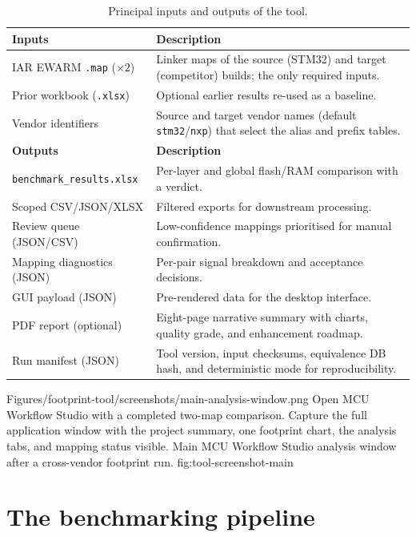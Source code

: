 \begin{table}[H]
\centering
\caption{Principal inputs and outputs of the tool.}
\label{tab:tool-io}
\begin{tabularx}{\textwidth}{l X}
\toprule
\textbf{Inputs} & \textbf{Description} \\
\midrule
IAR EWARM \texttt{.map} ($\times 2$) & Linker maps of the source (STM32) and target (competitor) builds; the only required inputs. \\
Prior workbook (\texttt{.xlsx}) & Optional earlier results re-used as a baseline. \\
Vendor identifiers & Source and target vendor names (default \texttt{stm32}/\texttt{nxp}) that select the alias and prefix tables. \\
\midrule
\textbf{Outputs} & \textbf{Description} \\
\midrule
\texttt{benchmark\_results.xlsx} & Per-layer and global flash/RAM comparison with a verdict. \\
Scoped CSV/JSON/XLSX & Filtered exports for downstream processing. \\
Review queue (JSON/CSV) & Low-confidence mappings prioritised for manual confirmation. \\
Mapping diagnostics (JSON) & Per-pair signal breakdown and acceptance decisions. \\
GUI payload (JSON) & Pre-rendered data for the desktop interface. \\
PDF report (optional) & Eight-page narrative summary with charts, quality grade, and enhancement roadmap. \\
Run manifest (JSON) & Tool version, input checksums, equivalence DB hash, and deterministic mode for reproducibility. \\
\bottomrule
\end{tabularx}
\end{table}

\reportscreenshot
  {Figures/footprint-tool/screenshots/main-analysis-window.png}
  {Open MCU Workflow Studio with a completed two-map comparison. Capture the full application window with the project summary, one footprint chart, the analysis tabs, and mapping status visible.}
  {Main MCU Workflow Studio analysis window after a cross-vendor footprint run.}
  {fig:tool-screenshot-main}

\section{The benchmarking pipeline}
\label{sec:tool-pipeline}

